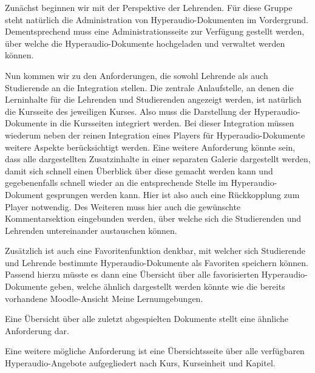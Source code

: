 Zunächst beginnen wir mit der Perspektive der Lehrenden. Für diese Gruppe steht natürlich die Administration von Hyperaudio-Dokumenten im Vordergrund. Dementsprechend muss eine Administrationsseite zur Verfügung gestellt werden, über welche die Hyperaudio-Dokumente hochgeladen und verwaltet werden können.

Nun kommen wir zu den Anforderungen, die sowohl Lehrende als auch Studierende an die Integration stellen. Die zentrale Anlaufstelle, an denen die Lerninhalte für die Lehrenden und Studierenden angezeigt werden, ist natürlich die Kursseite des jeweiligen Kurses. Also muss die Darstellung der Hyperaudio-Dokumente in die Kursseiten integriert werden. Bei dieser Integration müssen wiederum neben der reinen Integration eines Players für Hyperaudio-Dokumente weitere Aspekte berücksichtigt werden. Eine weitere Anforderung könnte sein, dass alle dargestellten Zusatzinhalte in einer separaten Galerie dargestellt werden, damit sich schnell einen Überblick über diese gemacht werden kann und gegebenenfalls schnell wieder an die entsprechende Stelle im Hyperaudio-Dokument gesprungen werden kann. Hier ist also auch eine Rückkopplung zum Player notwendig. Des Weiteren muss hier auch die gewünschte Kommentarsektion eingebunden werden, über welche sich die Studierenden und Lehrenden untereinander austauschen können.

Zusätzlich ist auch eine Favoritenfunktion denkbar, mit welcher sich Studierende und Lehrende bestimmte Hyperaudio-Dokumente als Favoriten speichern können. Passend hierzu müsste es dann eine Übersicht über alle favorisierten Hyperaudio-Dokumente geben, welche ähnlich dargestellt werden könnte wie die bereits vorhandene Moodle-Ansicht \glqq Meine Lernumgebungen\grqq.

Eine Übersicht über alle zuletzt abgespielten Dokumente stellt eine ähnliche Anforderung dar.

Eine weitere mögliche Anforderung ist eine Übersichtsseite über alle verfügbaren Hyperaudio-Angebote aufgegliedert nach Kurs, Kurseinheit und Kapitel.

